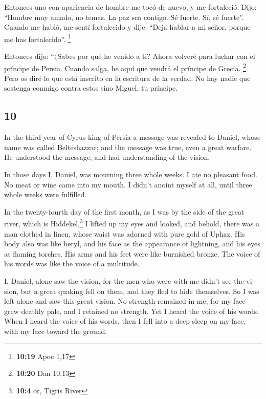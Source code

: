 \begin{paracol}{2}
 Entonces uno con apariencia de hombre me tocó de nuevo,
y me fortaleció.  Dijo: ``Hombre muy amado, no temas. La
paz sea contigo. Sé fuerte. Sí, sé fuerte''. Cuando me habló, me sentí
fortalecido y dije: ``Deja hablar a mi señor, porque me has
fortalecido''. \footnote{\textbf{10:19} Apoc 1,17}

 Entonces dijo: ``¿Sabes por qué he venido a ti? Ahora
volveré para luchar con el príncipe de Persia. Cuando salga, he aquí que
vendrá el príncipe de Grecia. \footnote{\textbf{10:20} Dan 10,13}
 Pero os diré lo que está inscrito en la escritura de la
verdad. No hay nadie que sostenga conmigo contra estos sino Miguel, tu
príncipe.

\switchcolumn
\begin{otherlanguage}{english}

\hypertarget{section-19}{%
\section{10}\label{section-19}}

 In the third year of Cyrus king of Persia a message was
revealed to Daniel, whose name was called Belteshazzar; and the message
was true, even a great warfare. He understood the message, and had
understanding of the vision.

 In those days I, Daniel, was mourning three whole weeks.
 I ate no pleasant food. No meat or wine came into my
mouth. I didn't anoint myself at all, until three whole weeks were
fulfilled.

 In the twenty-fourth day of the first month, as I was by
the side of the great river, which is Hiddekel,\footnote{\textbf{10:4}
  or, Tigris River}  I lifted up my eyes and looked, and
behold, there was a man clothed in linen, whose waist was adorned with
pure gold of Uphaz.  His body also was like beryl, and his
face as the appearance of lightning, and his eyes as flaming torches.
His arms and his feet were like burnished bronze. The voice of his words
was like the voice of a multitude.

 I, Daniel, alone saw the vision, for the men who were
with me didn't see the vision, but a great quaking fell on them, and
they fled to hide themselves.  So I was left alone and saw
this great vision. No strength remained in me; for my face grew deathly
pale, and I retained no strength.  Yet I heard the voice
of his words. When I heard the voice of his words, then I fell into a
deep sleep on my face, with my face toward the ground.


\end{otherlanguage}
\end{paracol}
